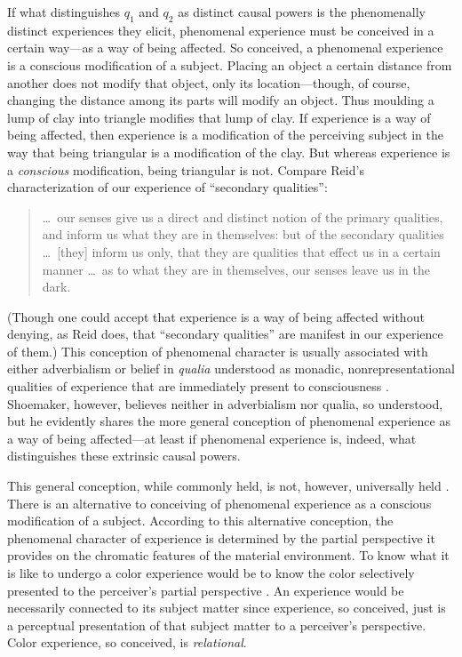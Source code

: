 \documentclass[12pt]{article}
\begin{document}
If what distinguishes $q_1$ and $q_2$ as distinct causal powers is the phenomenally distinct experiences they elicit, phenomenal experience must be conceived in a certain way---as a way of being affected. So conceived, a phenomenal experience is a conscious modification of a subject. Placing an object a certain distance from another does not modify that object, only its location---though, of course, changing the distance among its parts will modify an object. Thus moulding a lump of clay into triangle modifies that lump of clay. If experience is a way of being affected, then experience is a modification of the perceiving subject in the way that being triangular is a modification of the clay. But whereas experience is a \emph{conscious} modification, being triangular is not. Compare Reid's characterization of our experience of ``secondary qualities'': 
\begin{quote}
    \ldots\ our senses give us a direct and distinct notion of the primary qualities, and inform us what they are in themselves: but of the secondary qualities \ldots\ [they] inform us only, that they are qualities that effect us in a certain manner \ldots\ as to what they are in themselves, our senses leave us in the dark. \citep[II, 17]{Reid:1969lr}
\end{quote}
(Though one could accept that experience is a way of being affected without denying, as Reid does, that ``secondary qualities'' are manifest in our experience of them.) This conception of phenomenal character is usually associated with either adverbialism \citep[see][]{Ducasse:1942oq,Jackson:1977fk} or belief in \emph{qualia} understood as monadic, nonrepresentational qualities of experience that are immediately present to consciousness \citep[see][]{Block:1996qf,Jackson:1982my}. Shoemaker, however, believes neither in adverbialism nor qualia, so understood, but he evidently shares the more general conception of phenomenal experience as a way of being affected---at least if phenomenal experience is, indeed, what distinguishes these extrinsic causal powers.

This general conception, while commonly held, is not, however, universally held \cite[for criticism see][]{Campbell:2002ve,Kalderon:2006fk,Martin:1998nx}. There is an alternative to conceiving of phenomenal experience as a conscious modification of a subject. According to this alternative conception, the phenomenal character of experience is determined by the partial perspective it provides on the chromatic features of the material environment. To know what it is like to undergo a color experience would be to know the color selectively presented to the perceiver's partial perspective \citep[see][166, 172, 173--4]{Nagel:1979fk}. An experience would be necessarily connected to its subject matter since experience, so conceived, just is a perceptual presentation of that subject matter to a perceiver's perspective. Color experience, so conceived, is \emph{relational}.
\end{document}
